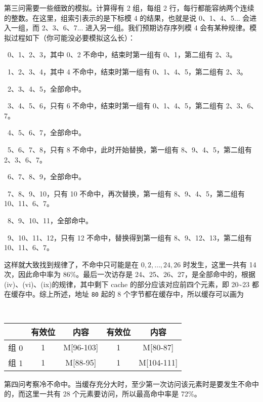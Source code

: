 \begin{problems}
        第三问需要一些细致的模拟。计算得有 2 组，每组 2 行，每行都能容纳两个连续的整数。在这里，组索引表示的是下标模 4 的结果，也就是说 0、1、4、5... 会进入一组，而 2、3、6、7... 进入另一组。我们预期访存序列模 4 会有某种规律。模拟过程如下（你可能没必要模拟这么长）：
        \begin{compactenum}[(i)]
            \item\ 0、1、2、3，其中 0、2 不命中，结束时第一组有 0、1，第二组有 2、3。
            \item\ 1、2、3、4，其中 4 不命中，结束时第一组有 0、1、4、5，第二组有 2、3。
            \item\ 2、3、4、5，全部命中。
            \item\ 3、4、5、6，只有 6 不命中，结束时第一组有 0、1、4、5，第二组有 2、3、6、7。
            \item\ 4、5、6、7，全部命中。
            \item\ 5、6、7、8，只有 8 不命中，此时开始替换，第一组有 8、9、4、5，第二组有 2、3、6、7。
            \item\ 6、7、8、9，全部命中。
            \item\ 7、8、9、10，只有 10 不命中，再次替换，第一组有 8、9、4、5，第二组有 10、11、6、7。
            \item\ 8、9、10、11，全部命中。
            \item\ 9、10、11、12，只有 12 不命中，替换得到第一组有 8、9、12、13，第二组有 10、11、6、7。
        \end{compactenum}
        这样就大致找到规律了，不命中只可能是在 $0, 2, \dotsc, 24, 26$ 时发生，这里一共有 14 次，因此命中率为 86\%。最后一次访存是 24、25、26、27，是全部命中的，根据(iv)、(vi)、(ix)的规律，其中剩下 cache 的部分应该对应前四个元素，即 20\textasciitilde23 都在缓存中。综上所述，地址 \verb|80| 起的 8 个字节都在缓存中，所以缓存可以画为
        \begin{table}[H]
            \tt
            \centering
            \begin{tabular}{|c|c|c|c|c|}
                \hline
                & 有效位 & 内容 & 有效位 & 内容 \\ \hline
                组 0 & 1 & M[96-103] & 1 & M[80-87] \\ \hline
                组 1 & 1 & M[88-95] & 1 & M[104-111] \\ \hline
            \end{tabular}
        \end{table}

        第四问考察冷不命中。当缓存充分大时，至少第一次访问该元素时是要发生不命中的，而这里一共有 28 个元素要访问，所以最高命中率是 72\%。
    \end{problems}

